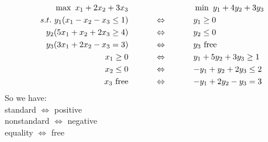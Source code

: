\documentclass[12 pt]{article}
\begin{document}
          \begin{align*}
            \max \ x_1 + 2x_2 + 3x_3  &\hspace{80 pt} \min \ y_1 + 4y_2 + 3y_3
            \\ s.t. \ y_1 (x_1 - x_2 - x_3  \leq 1)  & \hspace{32 pt}\Leftrightarrow \hspace{32 pt}
                                        y_1 \geq 0
            \\ y_2(5x_1 + x_2 + 2x_3 \geq 4) & \hspace{32 pt} \Leftrightarrow \hspace{32 pt} y_2 \leq 0
            \\ y_3(3x_1 + 2x_2 - x_3 = 3) & \hspace{32 pt} \Leftrightarrow \hspace{32 pt} y_3
                                                              \text{ free} 
            \\ x_1 \geq 0 &\hspace{32 pt} \Leftrightarrow \hspace{32 pt} y_1+5y_2+3y_3 \geq 1
            \\ x_2 \leq 0 & \hspace{32 pt} \Leftrightarrow \hspace{32 pt} -y_1 + y_2 + 2y_3 \leq 2 
            \\ x_3 \text{ free} &\hspace{32 pt} \Leftrightarrow \hspace{32 pt}  -y_1 + 2y_2 - y_3 = 3 
          \end{align*}
          So we have: \\
          standard $\Leftrightarrow$ positive
          \\ nonstandard $\Leftrightarrow$ negative
          \\ equality $\Leftrightarrow$ free
\end{document}
